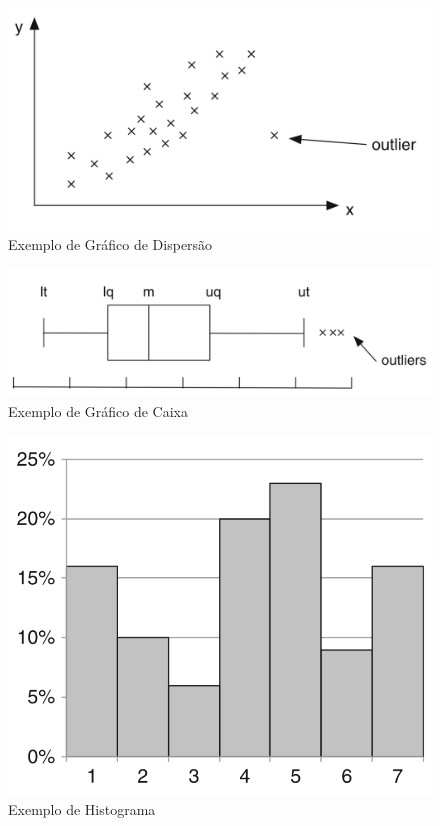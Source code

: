 \begin{figure}
    \centering
    
    \caption{Exemplo de Gráfico de Dispersão}
    
    \includegraphics[width=0.7\linewidth]{figuras/scatter.png}
    
    
    \label{fig:scatterplot}
\end{figure}

\begin{figure}
    \centering
    
    \caption{Exemplo de Gráfico de Caixa}
    
    \includegraphics[width=0.7\linewidth]{figuras/boxplot.png}
    
    
    \label{fig:boxplot}
\end{figure}

\begin{figure}
    \centering
    
    \caption{Exemplo de Histograma}
    
    \includegraphics[width=0.5\linewidth]{figuras/histogram.png}
    
    
    \label{fig:histogram}
\end{figure}

